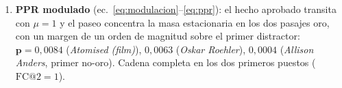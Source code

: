 \documentclass[11pt,a4paper]{article}
\newcommand{\norm}[1]{\lVert #1 \rVert}
\begin{document}
\begin{enumerate}[leftmargin=1.6em, itemsep=2pt]
  Normalizado por $\norm{\mathbf{v}}_1=115{,}8$: $0{,}0091$, $0{,}0086$,
  $0{,}0050$ y $0{,}0046$ respectivamente. La figura~\ref{fig:traza}
  recoge la trazabilidad completa, etapa a etapa, y la
  figura~\ref{fig:traza-subgrafo} el subgrafo efectivo. Obsérvese el punto crítico: la
  biografía del director tiene similitud densa mediocre con la pregunta
  (la pregunta habla de una madre y de una película; la palabra \guillemotleft{}Roehler\guillemotright{} no
  aparece) --- es la cadena
  hecho aprobado $\to$ entidad $\to$ pasaje propio la que la convierte en
  semilla.
\item \textbf{PPR modulado} (ec.~\ref{eq:modulacion}--\ref{eq:ppr}): el hecho
  aprobado transita con $\mu=1$ y el paseo concentra la masa estacionaria en
  los dos pasajes oro, con un margen de un orden de magnitud sobre el primer
  distractor: $\mathbf{p} = 0{,}0084$ (\emph{Atomised (film)}),
  $0{,}0063$ (\emph{Oskar Roehler}), $0{,}0004$ (\emph{Allison Anders},
  primer no-oro). Cadena completa en los dos primeros puestos
  ($\mathrm{FC@}2 = 1$).
\end{enumerate}
\end{document}
